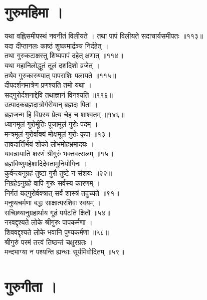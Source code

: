 \section{गुरुमहिमा ।}

यथा वह्निसमीपस्थं नवनीतं विलीयते । 
तथा पापं विलीयते सदाचार्यसमीपतः ॥११३॥\\
यदा दीप्तानलः काष्ठं शुष्कमार्द्रञ्च निर्दहेत् ।\\[-2mm]
तथा गुरुकटाक्षस्तु शिष्यपापं दहेत् क्षणात् ॥११४॥\\
यथा महानिलोद्धूतं तूलं दशदिशो व्रजेत् ।\\[-2mm]
तथैव गुरुकारुण्यात् पापराशिः पलायते ॥११५॥\\
दीपदर्शनमात्रेण प्रणश्यति तमो यथा ।\\[-2mm]
सद्गुरोर्दशनाद्देवि तथाज्ञानं विनश्यति ॥११६॥\\
उत्पादकब्रह्मदात्रोर्गरीयान् ब्रह्मदः पिता ।\\[-2mm]
ब्रह्मजन्म हि विप्रस्य प्रेत्य चेह च शाश्वतम् ॥१४६॥\\
ध्यानमूलं गुरोर्मूतिः पूजामूलं गुरोः पदम् ।\\[-2mm]
मन्त्रमूलं गुरोर्वाक्यं मोक्षमूलं गुरोः कृपा ॥१३॥\\
तावदार्त्तिर्भयं शोको लोभमोहभ्रमादयः ।\\[-2mm]
यावन्नायाति शरणं श्रीगुरुं भक्तवत्सलम् ॥१५॥\\
ब्रह्मविष्णुमहेशादिदेवतामुनियोगिनः ।\\[-2mm]
कुर्वन्त्यनुग्रहं तुष्टा गुरौ तुष्टे न संशयः ॥२२॥\\
निग्रहेऽनुग्रहे वापि गुरुः सर्वस्य कारणम् ।\\[-2mm]
निर्गतं यद्गुरोर्वक्त्रात् सर्वं शास्त्रं तदुच्यते ॥९१॥\\
मनुष्यचर्मणा बद्धः साक्षात्परशिवः स्वयम् ।\\[-2mm]
सच्छिष्यानुग्रहार्थाय गूढं पर्यटति क्षितौ ॥५४॥\\
नरवद्दृश्यते लोके श्रीगुरुः पापकर्मणा ।\\[-2mm]
शिववद्दृश्यते लोके भवानि पुण्यकर्मणा ॥५८॥\\
श्रीगुरुं परमं तत्त्वं तिष्ठन्तं चक्षुरग्रतः ।\\[-2mm]
मन्दभाग्या न पश्यन्ति ह्यन्धाः सूर्यमिवोदितम् ॥५९॥\\ 

\section{गुरुगीता ।}

